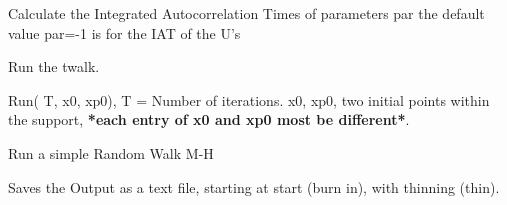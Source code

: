 \documentclass[letterpaper,10pt,english]{sphinxmanual}
\begin{document}
\begin{fulllineitems}
\begin{fulllineitems}
\end{fulllineitems}


\begin{fulllineitems}
\label{api/pytwalk:refl1d.pytwalk.pytwalk.IAT}
Calculate the Integrated Autocorrelation Times of parameters par
the default value par=-1 is for the IAT of the U's

\end{fulllineitems}


\begin{fulllineitems}
\label{api/pytwalk:refl1d.pytwalk.pytwalk.Run}
Run the twalk.

Run( T, x0, xp0),
T = Number of iterations.
x0, xp0, two initial points within the support,
\textbf{*each entry of x0 and xp0 most be different*}.

\end{fulllineitems}


\begin{fulllineitems}
\label{api/pytwalk:refl1d.pytwalk.pytwalk.RunRWMH}
Run a simple Random Walk M-H

\end{fulllineitems}


\begin{fulllineitems}
\label{api/pytwalk:refl1d.pytwalk.pytwalk.Save}
Saves the Output as a text file, starting at start (burn in), with thinning (thin).

\end{fulllineitems}


\begin{fulllineitems}
\label{api/pytwalk:refl1d.pytwalk.pytwalk.SimBlow}
\end{fulllineitems}


\end{fulllineitems}
\end{document}
